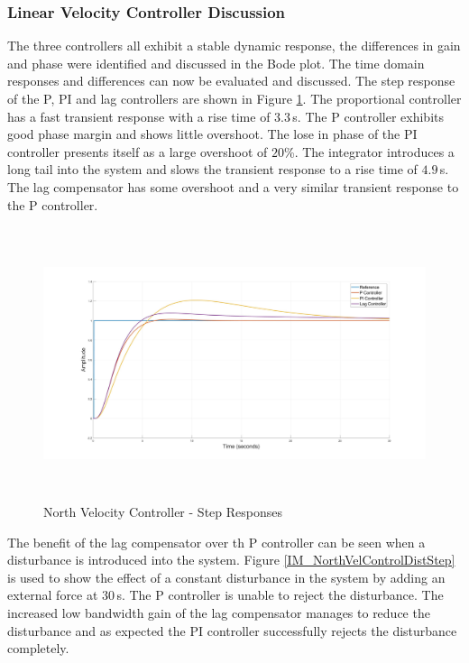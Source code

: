 		\subsubsection{Linear Velocity Controller Discussion}
		The three controllers all exhibit a stable dynamic response, the differences in gain and phase were identified and discussed in the Bode plot. The time domain responses and differences can now be evaluated and discussed. The step response of the P, PI and lag controllers are shown in Figure \ref{IM_NorthVelControlStep}. The proportional controller has a fast transient response with a rise time of $3.3$\,s. The P controller exhibits good phase margin and shows little overshoot. The lose in phase of the PI controller presents itself as a large overshoot of $20$\%. The integrator introduces a long tail into the system and slows the transient response to a rise time of $4.9$\,s. The lag compensator has some overshoot and a very similar transient response to the P controller.
		
		\begin{figure}[H]
			\centering
			\includegraphics[height = 8cm]{../Design/Matlab/Controllers/north_velocity_step.jpg}
			\caption{North Velocity Controller -  Step Responses}
			\label{IM_NorthVelControlStep}
		\end{figure}	
		
		The benefit of the lag compensator over th P controller can be seen when a disturbance is introduced into the system. Figure \ref{IM_NorthVelControlDistStep} is used to show the effect of a constant disturbance in the system by adding an external force at $30$\,s. The P controller is unable to reject the disturbance. The increased low bandwidth gain of the lag compensator manages to reduce the disturbance and as expected the PI controller successfully rejects the disturbance completely.
	
